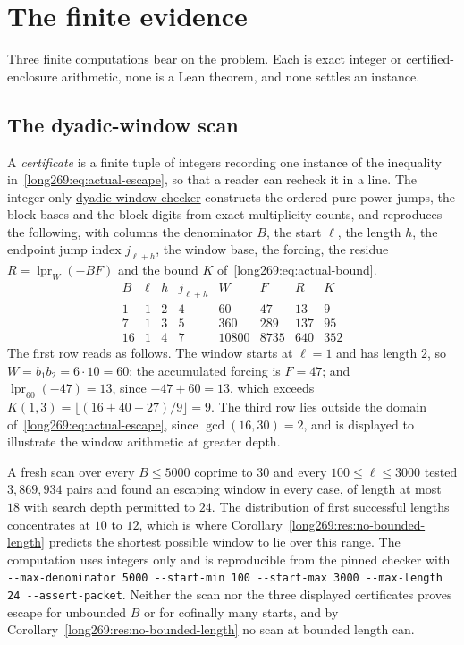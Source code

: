 \documentclass[11pt]{article}
\newcommand{\lpr}{\operatorname{lpr}}
\begin{document}
\statusboundary

\section{The finite evidence}\label{long269:sec:evidence}

Three finite computations bear on the problem.  Each is exact integer or
certified-enclosure arithmetic, none is a Lean theorem, and none settles an
instance.

\subsection{The dyadic-window scan}

A \emph{certificate} is a finite tuple of integers recording one instance of
the inequality in~\eqref{long269:eq:actual-escape}, so that a reader can recheck it in
a line.  The integer-only
\href{\sourceurl/scripts/check_erdos269_dyadic_windows.py}{dyadic-window
checker} constructs the ordered pure-power jumps, the block bases and the block
digits from exact multiplicity counts, and reproduces the following, with
columns the denominator $B$, the start $\ell$, the length $h$, the endpoint
jump index $j_{\ell+h}$, the window base, the forcing, the residue
$R=\lpr_{W}(-BF)$ and the bound $K$ of~\eqref{long269:eq:actual-bound}.
\[
\begin{array}{c|c|c|c|r|r|r|r}
B&\ell&h&j_{\ell+h}&W&F&R&K\\ \hline
1&1&2&4&60&47&13&9\\
7&1&3&5&360&289&137&95\\
16&1&4&7&10800&8735&640&352
\end{array}
\]
The first row reads as follows.  The window starts at $\ell=1$ and has length
$2$, so $W=b_1b_2=6\cdot10=60$; the accumulated forcing is $F=47$; and
$\lpr_{60}(-47)=13$, since $-47+60=13$, which exceeds
$K(1,3)=\lfloor(16+40+27)/9\rfloor=9$.  The third row lies outside the domain
of~\eqref{long269:eq:actual-escape}, since $\gcd(16,30)=2$, and is displayed to
illustrate the window arithmetic at greater depth.

A fresh scan over every $B\le5000$ coprime to $30$ and every $100\le\ell\le3000$
tested $3{,}869{,}934$ pairs and found an escaping window in every case, of
length at most $18$ with search depth permitted to $24$.  The distribution of
first successful lengths concentrates at $10$ to $12$, which is where
Corollary~\ref{long269:res:no-bounded-length} predicts the shortest possible window to
lie over this range.  The computation uses integers only and is reproducible
from the pinned checker with
\texttt{-{}-max-denominator 5000 -{}-start-min 100 -{}-start-max 3000
-{}-max-length 24 -{}-assert-packet}.  Neither the scan nor the three displayed
certificates proves escape for unbounded $B$ or for cofinally many starts, and
by Corollary~\ref{long269:res:no-bounded-length} no scan at bounded length can.
\end{document}
